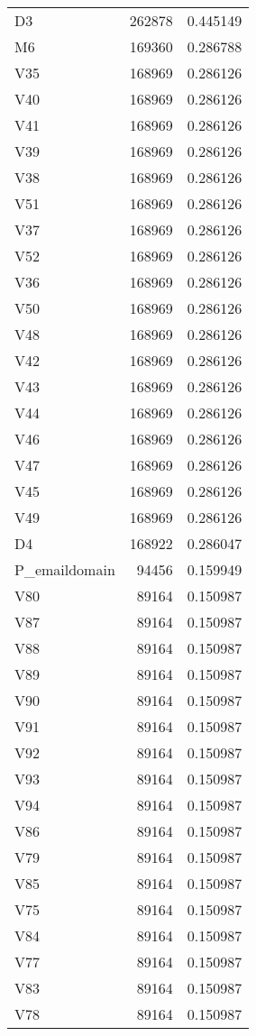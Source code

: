 \begin{tabular}{lrr}
D3 & 262878 & 0.445149 \\
M6 & 169360 & 0.286788 \\
V35 & 168969 & 0.286126 \\
V40 & 168969 & 0.286126 \\
V41 & 168969 & 0.286126 \\
V39 & 168969 & 0.286126 \\
V38 & 168969 & 0.286126 \\
V51 & 168969 & 0.286126 \\
V37 & 168969 & 0.286126 \\
V52 & 168969 & 0.286126 \\
V36 & 168969 & 0.286126 \\
V50 & 168969 & 0.286126 \\
V48 & 168969 & 0.286126 \\
V42 & 168969 & 0.286126 \\
V43 & 168969 & 0.286126 \\
V44 & 168969 & 0.286126 \\
V46 & 168969 & 0.286126 \\
V47 & 168969 & 0.286126 \\
V45 & 168969 & 0.286126 \\
V49 & 168969 & 0.286126 \\
D4 & 168922 & 0.286047 \\
P_emaildomain & 94456 & 0.159949 \\
V80 & 89164 & 0.150987 \\
V87 & 89164 & 0.150987 \\
V88 & 89164 & 0.150987 \\
V89 & 89164 & 0.150987 \\
V90 & 89164 & 0.150987 \\
V91 & 89164 & 0.150987 \\
V92 & 89164 & 0.150987 \\
V93 & 89164 & 0.150987 \\
V94 & 89164 & 0.150987 \\
V86 & 89164 & 0.150987 \\
V79 & 89164 & 0.150987 \\
V85 & 89164 & 0.150987 \\
V75 & 89164 & 0.150987 \\
V84 & 89164 & 0.150987 \\
V77 & 89164 & 0.150987 \\
V83 & 89164 & 0.150987 \\
V78 & 89164 & 0.150987 \\

\end{tabular}
